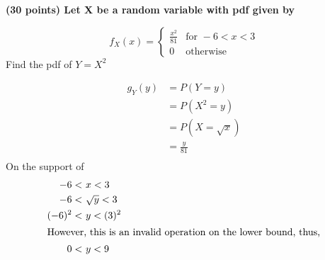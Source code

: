 \documentclass[12pt,letterpaper]{exam}
\begin{document}
\begin{questions}
\begin{solution}
\begin{parts}
	\end{parts}	
	\end{solution}
	\clearpage
	\setcounter{question}{2}
	\question 
	
	\textbf{(30 points) Let X be a random variable with pdf given by}
	
	\[
	f_X(x) = \begin{cases}
		\frac{x^2}{81} & \text{for } -6<x<3 \\
		0 & \text{otherwise}
	\end{cases}
	\]
	Find the pdf of \(Y=X^2\)
	
	\begin{solution}
		\begin{align*}
			g_Y(y)
			&= P(Y=y) \\
			&= P(X^2=y) \\
			&= P(X=\sqrt x) \\
			&= \frac{y}{81} \\
		\end{align*}
		On the support of
		\begin{align*}
			-6<\ &x<3 \\
			-6<\ &\sqrt y<3 \\
			(-6)^2<\ &y<(3)^2 \\
		\intertext{However, this is an invalid operation on the lower bound, thus,}
			0<\ &y<9 \\
		\end{align*}
		
	\end{solution}
		

\end{questions}
\end{document}
